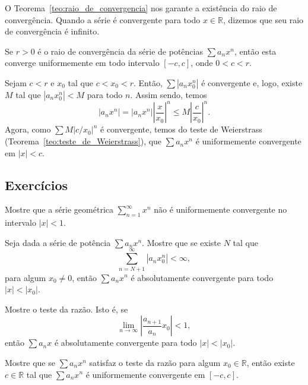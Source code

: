 \begin{obs}
  O Teorema~\ref{teo:raio_de_convergencia} nos garante a existência do raio de convergência. Quando a série é convergente para todo $x\in\mathbb{R}$, dizemos que seu raio de convergência é infinito.
\end{obs}

\begin{teo}
  Se $r>0$ é o raio de convergência da série de potências $\sum a_nx^n$, então esta converge uniformemente em todo intervalo $[-c, c]$, onde $0<c<r$.
\end{teo}
\begin{dem}
  Sejam $c<r$ e $x_0$ tal que $c<x_0<r$. Então, $\sum |a_nx_0^n|$ é convergente e, logo, existe $M$ tal que $|a_nx_0^n|<M$ para todo $n$. Assim sendo, temos
  \begin{equation}
    |a_nx^n| = |a_nx^n|\left|\frac{x}{x_0}\right|^n \leq M\left|\frac{c}{x_0}\right|^n.
  \end{equation}
Agora, como $\sum M|c/x_0|^n$ é convergente, temos do teste de Weierstrass (Teorema~\ref{teo:teste_de_Weierstrass}), que $\sum a_nx^n$ é uniformemente convergente em $|x|< c$.
\end{dem}


\subsection*{Exercícios}

\begin{exer}
  Mostre que a série geométrica $\sum_{n=1}^\infty x^n$ não é uniformemente convergente no intervalo $|x|<1$.
\end{exer}

\begin{exer}
  Seja dada a série de potência $\sum a_nx^n$. Mostre que se existe $N$ tal que
  \begin{equation}
    \sum_{n=N+1}^\infty |a_nx_0^n| < \infty,
  \end{equation}
para algum $x_0\neq 0$, então $\sum a_nx^n$ é absolutamente convergente para todo $|x|<|x_0|$.
\end{exer}

\begin{exer}
  Mostre o teste da razão. Isto é, se
  \begin{equation}
    \lim_{n\to\infty} \left|\frac{a_{n+1}}{a_n}x_0\right| < 1,
  \end{equation}
então $\sum a_nx$ é absolutamente convergente para todo $|x|<|x_0|$.
\end{exer}

\begin{exer}
  Mostre que se $\sum a_nx^n$ satisfaz o teste da razão para algum $x_0\in\mathbb{R}$, então existe $c\in\mathbb{R}$ tal que $\sum a_nx^n$ é uniformemente convergente em $[-c, c]$.
\end{exer}
